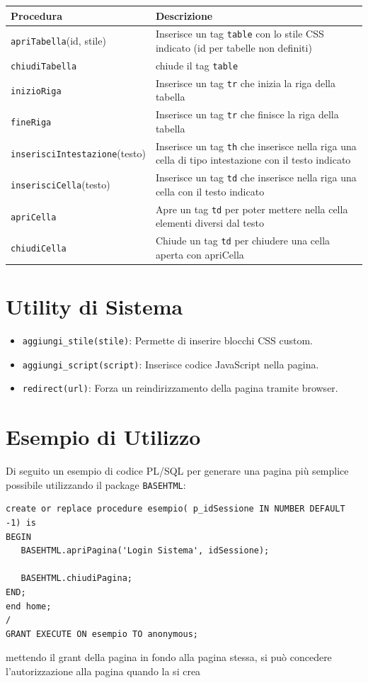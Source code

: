 \documentclass[a4paper,12pt]{article}
\begin{document}
\begin{longtable}{@{}p{5cm} p{8cm}@{}}
\toprule
\textbf{Procedura} & \textbf{Descrizione} \\ \midrule
\texttt{apriTabella}(id, stile) & Inserisce un tag \texttt{table} con lo stile CSS indicato (id per tabelle non definiti)\\
\texttt{chiudiTabella} & chiude il tag \texttt{table}\\
\texttt{inizioRiga} & Inserisce un tag \texttt{tr} che inizia la riga della tabella\\
\texttt{fineRiga} & Inserisce un tag \texttt{tr} che finisce la riga della tabella\\
\texttt{inserisciIntestazione}(testo) & Inserisce un tag \texttt{th} che inserisce nella riga una cella di tipo intestazione con il testo indicato\\
\texttt{inserisciCella}(testo) & Inserisce un tag \texttt{td} che inserisce nella riga una cella con il testo indicato\\
\texttt{apriCella} & Apre un tag \texttt{td} per poter mettere nella cella elementi diversi dal testo\\
\texttt{chiudiCella} & Chiude un tag \texttt{td} per chiudere una cella aperta con apriCella\\


\bottomrule
\end{longtable}

\section{Utility di Sistema}
\begin{itemize}
    \item \texttt{aggiungi\_stile(stile)}: Permette di inserire blocchi CSS custom.
    \item \texttt{aggiungi\_script(script)}: Inserisce codice JavaScript nella pagina.
    \item \texttt{redirect(url)}: Forza un reindirizzamento della pagina tramite browser.
\end{itemize}

\section{Esempio di Utilizzo}
Di seguito un esempio di codice PL/SQL per generare una pagina più semplice possibile utilizzando il package \texttt{BASEHTML}:

\begin{lstlisting}
create or replace procedure esempio( p_idSessione IN NUMBER DEFAULT -1) is
BEGIN
   BASEHTML.apriPagina('Login Sistema', idSessione);
   
   BASEHTML.chiudiPagina;
END;
end home;
/
GRANT EXECUTE ON esempio TO anonymous;
\end{lstlisting}
mettendo il grant della pagina in fondo alla pagina stessa, si può concedere l'autorizzazione alla pagina quando la si crea
\end{document}
